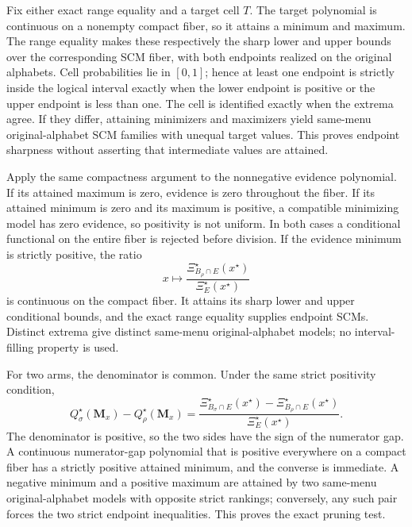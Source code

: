 Fix either exact range equality and a target cell \(T\).  The target polynomial is continuous on a nonempty compact fiber, so it attains a minimum and maximum.  The range equality makes these respectively the sharp lower and upper bounds over the corresponding SCM fiber, with both endpoints realized on the original alphabets.  Cell probabilities lie in \([0,1]\); hence at least one endpoint is strictly inside the logical interval exactly when the lower endpoint is positive or the upper endpoint is less than one.  The cell is identified exactly when the extrema agree.  If they differ, attaining minimizers and maximizers yield same-menu original-alphabet SCM families with unequal target values.  This proves endpoint sharpness without asserting that intermediate values are attained.

Apply the same compactness argument to the nonnegative evidence polynomial.  If its attained maximum is zero, evidence is zero throughout the fiber.  If its attained minimum is zero and its maximum is positive, a compatible minimizing model has zero evidence, so positivity is not uniform.  In both cases a conditional functional on the entire fiber is rejected before division.  If the evidence minimum is strictly positive, the ratio
\[
x\longmapsto
\frac{\Xi_{B_\rho\cap E}^\star(x^\star)}
{\Xi_E^\star(x^\star)}
\]
is continuous on the compact fiber.  It attains its sharp lower and upper conditional bounds, and the exact range equality supplies endpoint SCMs.  Distinct extrema give distinct same-menu original-alphabet models; no interval-filling property is used.

For two arms, the denominator is common.  Under the same strict positivity condition,
\[
Q_\sigma^\star(\mathbf M_x)-Q_\rho^\star(\mathbf M_x)
=\frac{\Xi_{B_\sigma\cap E}^\star(x^\star)
-\Xi_{B_\rho\cap E}^\star(x^\star)}
{\Xi_E^\star(x^\star)}.
\]
The denominator is positive, so the two sides have the sign of the numerator gap.  A continuous numerator-gap polynomial that is positive everywhere on a compact fiber has a strictly positive attained minimum, and the converse is immediate.  A negative minimum and a positive maximum are attained by two same-menu original-alphabet models with opposite strict rankings; conversely, any such pair forces the two strict endpoint inequalities.  This proves the exact pruning test.

